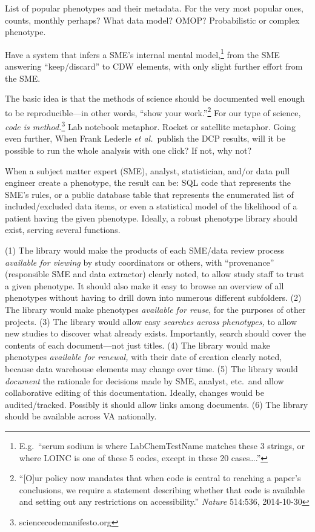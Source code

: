 \documentclass{tufte-handout}
\begin{document}

List of popular phenotypes and their metadata. For the very most
popular ones, counts, monthly perhaps? What data model? OMOP?
Probabilistic or complex phenotype.

Have a system that infers a SME's internal mental
model,\footnote{E.g.\ ``serum sodium is where LabChemTestName matches
  these 3 strings, or where LOINC is one of these 5 codes, except in
  these 20 cases\ldots{}.''} from the SME answering ``keep/discard'' to CDW
elements, with only slight further effort from the SME.

The basic idea is that the methods of science should be documented
well enough to be reproducible---in other words, ``show your
work.''\footnote{``[O]ur policy now mandates that when code is central
  to reaching a paper's conclusions, we require a statement describing
  whether that code is available and setting out any restrictions on
  accessibility.'' \emph{Nature} 514:536, 2014-10-30} For our type of
science, \emph{code is method.}\footnote{sciencecodemanifesto.org} Lab
notebook metaphor. Rocket or satellite metaphor. Going even further,
When Frank Lederle \emph{et al.}\ publish the DCP results, will it be
possible to run the whole analysis with one click? If not, why not?


When a subject matter expert (SME), analyst, statistician, and/or data
pull engineer create a phenotype, the result can be: SQL code that
represents the SME's rules, or a public database table that represents
the enumerated list of included/excluded data items, or even a
statistical model of the likelihood of a patient having the given
phenotype. Ideally, a robust phenotype library should exist, serving
several functions.

(1) The library would make the products of each SME/data review
process \emph{available for viewing} by study coordinators or others,
with ``provenance'' (responsible SME and data extractor) clearly
noted, to allow study staff to trust a given phenotype. It should also
make it easy to browse an overview of all phenotypes without having to
drill down into numerous different subfolders. (2) The library would
make phenotypes \emph{available for reuse}, for the purposes of other
projects. (3) The library would allow easy \emph{searches across
  phenotypes,} to allow new studies to discover what already exists.
Importantly, search should cover the contents of each document---not
just titles. (4) The library would make phenotypes \emph{available for
  renewal,} with their date of creation clearly noted, because data
warehouse elements may change over time. (5) The library would
\emph{document} the rationale for decisions made by SME, analyst,
etc.\ and allow collaborative editing of this documentation. Ideally,
changes would be audited/tracked. Possibly it should allow links among
documents. (6) The library should be available across VA nationally.
\end{document}
